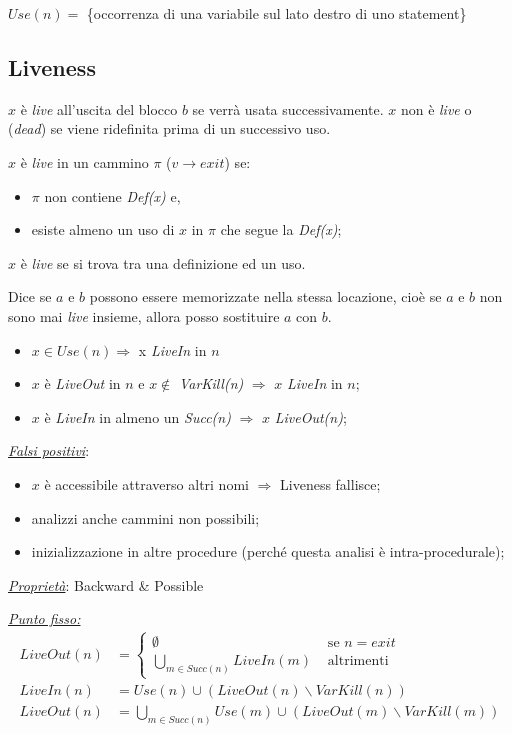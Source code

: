 \documentclass[a4paper, 10pt]{book}
\begin{document}
$Use(n) = $ \{occorrenza di una variabile sul lato destro di uno statement\}

\newpage
\subsection{Liveness}
$x$ è \textit{live} all'uscita del blocco $b$ se verrà usata successivamente. $x$ non è \textit{live} o (\textit{dead}) se viene ridefinita prima di un successivo uso.

\noindent
$x$ è \textit{live} in un cammino $\pi$ ($v\rightarrow exit$) se:
\begin{itemize}
	\item $\pi$ non contiene \textit{Def(x)} e,
	\item esiste almeno un uso di $x$ in $\pi$ che segue la \textit{Def(x)};
\end{itemize}
\noindent
$x$ è \textit{live} se si trova tra una definizione ed un uso.

\noindent
Dice se $a$ e $b$ possono essere memorizzate nella stessa locazione, cioè se $a$ e $b$ non sono mai \textit{live} insieme, allora posso sostituire $a$ con $b$.

\begin{itemize}
	\item $x\in Use(n) \Rightarrow$ x \textit{LiveIn} in $n$
	\item $x$ è \textit{LiveOut} in $n$ e $x\notin$ \textit{VarKill(n)} $\Rightarrow$ $x$ \textit{LiveIn} in $n$;
	\item $x$ è \textit{LiveIn} in almeno un \textit{Succ(n)} $\Rightarrow$ $x$ \textit{LiveOut(n)};
\end{itemize}

\noindent
\textit{\underline{Falsi positivi}}:
\begin{itemize}
	\item $x$ è accessibile attraverso altri nomi $\Rightarrow$ Liveness fallisce;
	\item analizzi anche cammini non possibili;
	\item inizializzazione in altre procedure (perché questa analisi è intra-procedurale);
\end{itemize}

\noindent
\textit{\underline{Proprietà}}: Backward \& Possible
\newline

\noindent
\underline{\textit{Punto fisso:}}
\begin{align*}
	LiveOut(n) &=
	\begin{cases}
		\emptyset &\text{ se $n= exit$} \\
		\bigcup_{m\in Succ(n)} LiveIn(m) &\text{ altrimenti}
	\end{cases}\\
	LiveIn(n) &= Use(n) \cup (LiveOut(n)\backslash VarKill(n))\\
	LiveOut(n) &= \bigcup_{m\in Succ(n)} Use(m) \cup (LiveOut(m)\backslash VarKill(m))
\end{align*}
\end{document}
